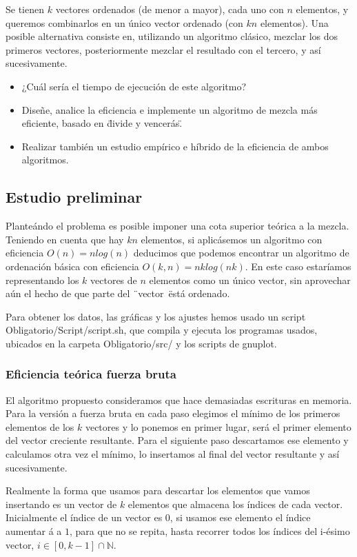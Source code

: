 
Se tienen $k$ vectores ordenados (de menor a mayor), cada uno con $n$ elementos, y queremos combinarlos en un \'unico vector ordenado (con $kn$ elementos). 
Una posible alternativa consiste en, utilizando un algoritmo cl\'asico, mezclar los dos primeros vectores, posteriormente mezclar el resultado con el tercero, y as\'i sucesivamente.

\begin{itemize}
    \item ¿Cu\'al ser\'ia el tiempo de ejecuci\'on de este algoritmo?
	\item Diseñe, analice la eficiencia e implemente un algoritmo de mezcla m\'as eficiente, 		  basado en \"divide y vencer\'as\".
	\item Realizar tambi\'en un estudio emp\'irico e h\'ibrido de la eficiencia de ambos 				  algoritmos.
\end{itemize}

\subsection{Estudio preliminar}
Plante\'ando el problema es posible imponer una cota superior te\'orica a la mezcla. Teniendo en cuenta que hay $kn$ elementos, si aplic\'asemos un algoritmo con eficiencia  $O(n)=nlog(n)$ deducimos que podemos encontrar un algoritmo de ordenaci\'on b\'asica con eficiencia $O(k,n)=nklog(nk)$. En este caso estar\'iamos representando los $k$ vectores de $n$ elementos como un \'unico vector, sin aprovechar a\'un el hecho de que parte del \"\ vector\ \" est\'a ordenado.

Para obtener los datos, las gr\'aficas y los ajustes hemos usado un script 
Obligatorio/Script/script.sh, que compila y ejecuta los programas usados, ubicados en la carpeta Obligatorio/src/ y los scripts de gnuplot.

\subsubsection{Eficiencia te\'orica fuerza bruta}
El algoritmo propuesto consideramos que hace demasiadas escrituras en memoria.
Para la versi\'on a fuerza bruta en cada paso elegimos el m\'inimo de los primeros elementos de los $k$ vectores y lo ponemos en primer lugar, ser\'a el primer elemento del vector creciente resultante. Para el siguiente paso descartamos ese elemento y calculamos otra vez el m\'inimo, lo insertamos al final del vector resultante y as\'i sucesivamente.

Realmente la forma que usamos para descartar los elementos que vamos insertando es un vector de $k$ elementos que almacena los \'indices de cada vector. Inicialmente el \'indice de un vector es $0$, si usamos ese elemento el \'indice aumentar	\'a a $1$, para que no se repita, hasta recorrer todos los \'indices del i-\'esimo vector, $i \in [0,k-1]\cap \mathbb{N}$.

